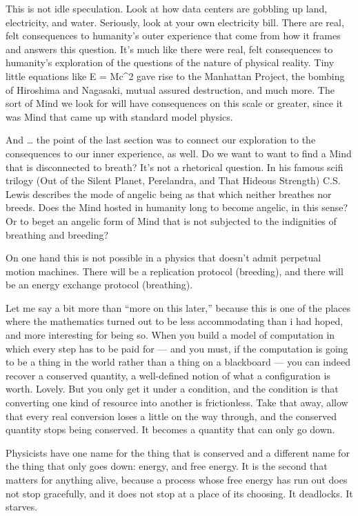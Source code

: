 This is not idle speculation. Look at how data centers are gobbling up land, electricity, and water. Seriously, look at your own electricity bill. There are real, felt consequences to humanity's outer experience that come from how it frames and answers this question. It's much like there were real, felt consequences to humanity's exploration of the questions of the nature of physical reality. Tiny little equations like E = Mc\textasciicircum{}2 gave rise to the Manhattan Project, the bombing of Hiroshima and Nagasaki, mutual assured destruction, and much more. The sort of Mind we look for will have consequences on this scale or greater, since it was Mind that came up with standard model physics.

And \ldots{} the point of the last section was to connect our exploration to the consequences to our inner experience, as well. Do we want to want to find a Mind that is disconnected to breath? It's not a rhetorical question. In his famous scifi trilogy (Out of the Silent Planet, Perelandra, and That Hideous Strength) C.S. Lewis describes the mode of angelic being as that which neither breathes nor breeds. Does the Mind hosted in humanity long to become angelic, in this sense? Or to beget an angelic form of Mind that is not subjected to the indignities of breathing and breeding? 

On one hand this is not possible in a physics that doesn't admit perpetual motion machines. There will be a replication protocol (breeding), and there will be an energy exchange protocol (breathing).

Let me say a bit more than ``more on this later,'' because this is one of the places where the mathematics turned out to be less accommodating than i had hoped, and more interesting for being so. When you build a model of computation in which every step has to be paid for --- and you must, if the computation is going to be a thing in the world rather than a thing on a blackboard --- you can indeed recover a conserved quantity, a well-defined notion of what a configuration is worth. Lovely. But you only get it under a condition, and the condition is that converting one kind of resource into another is frictionless. Take that away, allow that every real conversion loses a little on the way through, and the conserved quantity stops being conserved. It becomes a quantity that can only go down.

Physicists have one name for the thing that is conserved and a different name for the thing that only goes down: energy, and free energy. It is the second that matters for anything alive, because a process whose free energy has run out does not stop gracefully, and it does not stop at a place of its choosing. It deadlocks. It starves.

